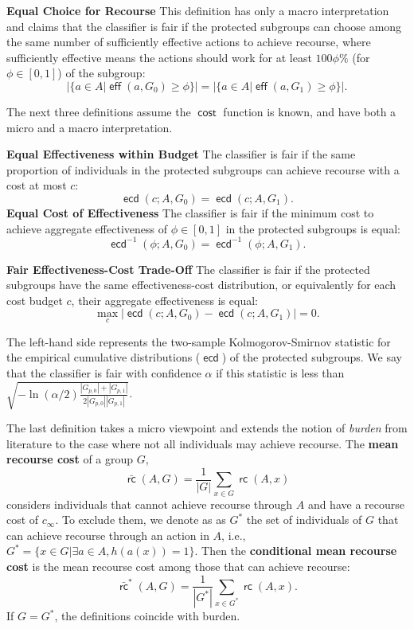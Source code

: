 \documentclass{article}
\DeclareMathOperator{\cost}{\mathsf{cost}}
\DeclareMathOperator{\rc}{\mathsf{rc}}
\DeclareMathOperator{\eff}{\mathsf{eff}}
\DeclareMathOperator{\ecd}{\mathsf{ecd}}
\begin{document}
\smallskip\noindent\textbf{Equal Choice for Recourse}
%
This definition has only a macro interpretation and claims that the classifier is fair if the protected subgroups can choose among the same number of sufficiently effective actions to achieve recourse, where sufficiently effective means the actions should work for at least $100\phi \%$ (for $\phi \in [0,1]$) of the subgroup:
%
\[
| \{ a \in A | \eff(a, G_0) \ge \phi  \} | = | \{ a \in A | \eff(a, G_1) \ge \phi  \} |.
\]
%

The next three definitions assume the $\cost$ function is known, and have both a micro and a macro interpretation.

\smallskip\noindent\textbf{Equal Effectiveness within Budget}
%
The classifier is fair if the same proportion of individuals in the protected subgroups can achieve recourse with a cost at most $c$:
%
\[
\ecd(c; A, G_{0}) = \ecd(c; A, G_{1}).
\] 
%
\smallskip\noindent\textbf{Equal Cost of Effectiveness}
%
The classifier is fair if the minimum cost to achieve aggregate effectiveness of $\phi \in [0, 1]$ in the protected subgroups is equal:
%
\[
\ecd^{-1}(\phi; A, G_{0}) = \ecd^{-1}(\phi; A, G_{1}).
\]


\smallskip\noindent\textbf{Fair Effectiveness-Cost Trade-Off}
%
The classifier is fair if the protected subgroups have the same effectiveness-cost distribution, or equivalently for each cost budget $c$, their aggregate effectiveness is equal:
%
\[
\max_{c} |\ecd(c; A, G_{0}) - \ecd(c; A, G_{1})|  = 0 .
\]
%

The left-hand side represents the two-sample Kolmogorov-Smirnov statistic for the empirical cumulative distributions ($\ecd$) of the protected subgroups.
We say that the classifier is fair with confidence $\alpha$ if this statistic is less than $\sqrt{ -\ln({\alpha}/2) \frac{|G_{p,0}| + |G_{p,1}| }{2 |G_{p,0}| |G_{p,1}|} }$.

The last definition takes a micro viewpoint and extends the notion of \emph{burden} \cite{2020_AIES_SHG} from literature to the case where not all individuals may achieve recourse.
The \textbf{mean recourse cost} of a group $G$,
%
\[
\bar{\rc}(A,G)  = \frac{1}{|G|} \sum_{x \in G} \rc(A,x)
\]
%
considers individuals that cannot achieve recourse through $A$ and have a recourse cost of $c_\infty$. To exclude them, we denote as as $G^*$ the set of individuals of $G$ that can achieve recourse through an action in $A$, i.e., $G^* = \{ x \in G | \exists a \in A, h(a(x)) = 1 \}$. Then the \textbf{conditional mean recourse cost} is the mean recourse cost among those that can achieve recourse:
%
\[
\bar{\rc}^*(A,G)  = \frac{1}{|G^*|} \sum_{x \in G^*} \rc(A,x).
\]
%
If $G=G^*$, the definitions coincide with burden.
\end{document}
